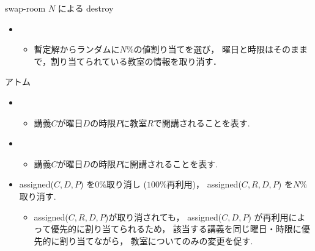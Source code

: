 \documentclass[11pt,dvipdfmx]{beamer}
\begin{document}
\begin{frame}{swap-room $N$ による destroy}
 \begin{block}{}
 \begin{itemize}
  \item {}
   \begin{itemize}
    \item 暫定解からランダムに$N$\%の値割り当てを選び，
    曜日と時限はそのままで，割り当てられている教室の情報を取り消す．
   \end{itemize}
  \end{itemize}
 \end{block}
 \begin{exampleblock}{アトム}
  \begin{itemize}
   \item {}
   \begin{itemize}
    \item 講義$C$が曜日$D$の時限$P$に教室$R$で開講されることを表す.
   \end{itemize}
   \item {}
   \begin{itemize}
    \item 講義$C$が曜日$D$の時限$P$に開講されることを表す.
   \end{itemize}
  \end{itemize}
 \end{exampleblock}
 \begin{itemize}
  \item assigned($C,D,P$) を$0$\%取り消し ($100$\%再利用)，
  assigned($C,R,D,P$) を$N$\%取り消す.
  \begin{itemize}
   \item assigned($C,R,D,P$)が取り消されても，
   assigned($C,D,P$) が再利用によって優先的に割り当てられるため，
   該当する講義を同じ曜日・時限に優先的に割り当てながら，
   教室についてのみの変更を促す.
  \end{itemize}
 \end{itemize}
\end{frame}
\end{document}
